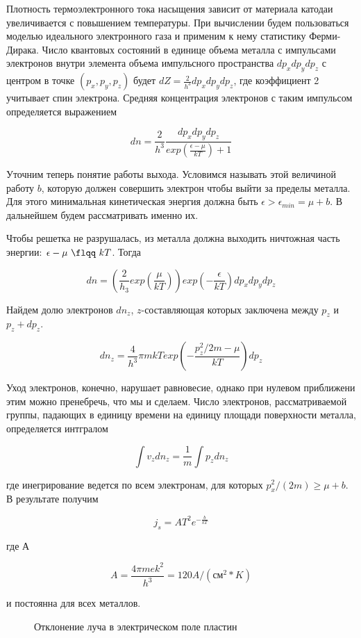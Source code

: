 \documentclass[14pt]{article}
\begin{document}
Плотность термоэлектронного тока насыщения зависит от материала катодаи увеличивается с повышением температуры. При вычислении будем пользоваться моделью идеального электронного газа и применим к нему статистику Ферми-Дирака. Число квантовых состояний в единице объема металла с импульсами электронов внутри элемента объема импульсного пространства $dp_xdp_ydp_z$ с центром в точке $(p_x, p_y, p_z)$ будет $dZ = \frac{2}{h^3}dp_xdp_ydp_z$, где коэффициент 2 учитывает спин электрона. Средняя концентрация электронов с таким импульсом определяется выражением

$$dn = \frac{2}{h^3}\frac{dp_xdp_ydp_z}{exp\left(\frac{\epsilon - \mu}{kT}\right) + 1}$$

Уточним теперь понятие работы выхода. Условимся называть этой величиной работу $b$, которую должен совершить электрон чтобы выйти за пределы металла. Для этого минимальная кинетическая энергия должна быть 
$\epsilon > \epsilon_{min} = \mu + b$. В дальнейшем будем рассматривать именно их. 

Чтобы решетка не разрушалась, из металла должна выходить ничтожная часть энергии: $\epsilon - \mu~\flqq~kT$. Тогда

$$dn = \left(\frac{2}{h_3}exp\left(\frac{\mu}{kT}\right)\right)exp\left(-\frac{\epsilon}{kT}\right)dp_xdp_ydp_z$$

Найдем долю электронов $dn_z$, $z$-составляющая которых заключена между $p_z$ и $p_z + dp_z$. 

$$dn_z = \frac{4}{h^3}\pi mkTexp\left(-\frac{p_z^2/2m - \mu}{kT}\right)dp_z$$

Уход электронов, конечно, нарушает равновесие, однако при нулевом приближени этим можно пренебречь, что мы и сделаем. Число электронов, рассматриваемой группы, падающих в единицу времени на единицу площади поверхности металла, определяется интгралом 

$$\int v_zdn_z = \frac{1}{m}\int p_zdn_z$$

\noindent где инегрирование ведется по всем электронам, для которых $p_x^2/(2m) \geq \mu + b $. В результате получим

$$j_s = AT^2e^{-\frac{b}{kT}}$$

\noindent где А

$$A = \frac{4\pi mek^2}{h^3} = 120 A/(\text{см}^2*K)$$

\noindent и постоянна для всех металлов. 

\begin{figure}[h!]
	\caption{Отклонение луча в электрическом поле пластин}
	\label{fig:image}
\end{figure}
\end{document}
